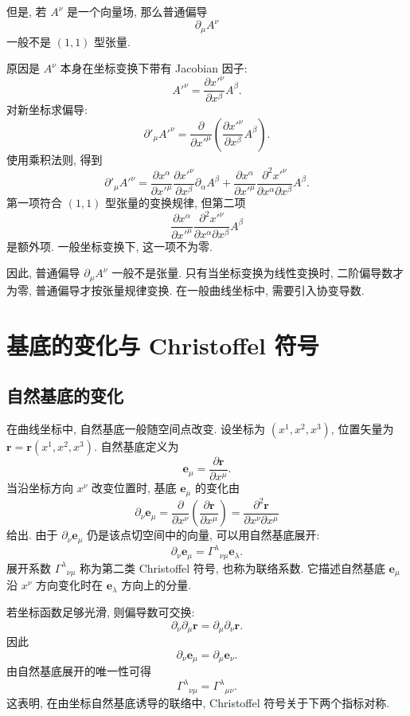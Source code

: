 但是, 若 $A^\nu$ 是一个向量场, 那么普通偏导
\[
\partial_\mu A^\nu
\]
一般不是 $(1,1)$ 型张量. 

原因是 $A^\nu$ 本身在坐标变换下带有 Jacobian 因子: 
\[
A'^\nu
=
\frac{\partial x'^\nu}{\partial x^\beta}A^\beta.
\]
对新坐标求偏导: 
\[
\partial'_\mu A'^\nu
=
\frac{\partial}{\partial x'^\mu}
\left(
\frac{\partial x'^\nu}{\partial x^\beta}A^\beta
\right).
\]
使用乘积法则, 得到
\[
\partial'_\mu A'^\nu
=
\frac{\partial x^\alpha}{\partial x'^\mu}
\frac{\partial x'^\nu}{\partial x^\beta}
\partial_\alpha A^\beta
+
\frac{\partial x^\alpha}{\partial x'^\mu}
\frac{\partial^2 x'^\nu}{\partial x^\alpha\partial x^\beta}
A^\beta.
\]
第一项符合 $(1,1)$ 型张量的变换规律, 但第二项
\[
\frac{\partial x^\alpha}{\partial x'^\mu}
\frac{\partial^2 x'^\nu}{\partial x^\alpha\partial x^\beta}
A^\beta
\]
是额外项. 一般坐标变换下, 这一项不为零. 

因此, 普通偏导 $\partial_\mu A^\nu$ 一般不是张量. 只有当坐标变换为线性变换时, 二阶偏导数才为零, 普通偏导才按张量规律变换. 在一般曲线坐标中, 需要引入协变导数. 

\section{基底的变化与 Christoffel 符号}

\subsection{自然基底的变化}

在曲线坐标中, 自然基底一般随空间点改变. 设坐标为 $(x^{1},x^{2},x^{3})$, 位置矢量为 $\bm{r}=\bm{r}(x^{1},x^{2},x^{3})$. 自然基底定义为
\[
\bm{e}_{\mu}
=
\frac{\partial \bm{r}}{\partial x^{\mu}}.
\]
当沿坐标方向 $x^{\nu}$ 改变位置时, 基底 $\bm{e}_{\mu}$ 的变化由
\[
\partial_{\nu}\bm{e}_{\mu}
=
\frac{\partial}{\partial x^{\nu}}
\left(
\frac{\partial \bm{r}}{\partial x^{\mu}}
\right)
=
\frac{\partial^{2}\bm{r}}{\partial x^{\nu}\partial x^{\mu}}
\]
给出. 由于 $\partial_{\nu}\bm{e}_{\mu}$ 仍是该点切空间中的向量, 可以用自然基底展开: 
\begin{equation}
	\partial_{\nu}\bm{e}_{\mu}
	=
	\Gamma^{\lambda}{}_{\nu\mu}\bm{e}_{\lambda}.
	\label{eq:2.1}
\end{equation}
展开系数 $\Gamma^{\lambda}{}_{\nu\mu}$ 称为第二类 Christoffel 符号, 也称为联络系数. 它描述自然基底 $\bm{e}_{\mu}$ 沿 $x^{\nu}$ 方向变化时在 $\bm{e}_{\lambda}$ 方向上的分量. 

若坐标函数足够光滑, 则偏导数可交换: 
\[
\partial_{\nu}\partial_{\mu}\bm{r}
=
\partial_{\mu}\partial_{\nu}\bm{r}.
\]
因此
\[
\partial_{\nu}\bm{e}_{\mu}
=
\partial_{\mu}\bm{e}_{\nu}.
\]
由自然基底展开的唯一性可得
\begin{equation}
	\Gamma^{\lambda}{}_{\nu\mu}
	=
	\Gamma^{\lambda}{}_{\mu\nu}.
	\label{eq:2.2}
\end{equation}
这表明, 在由坐标自然基底诱导的联络中, Christoffel 符号关于下两个指标对称. 

